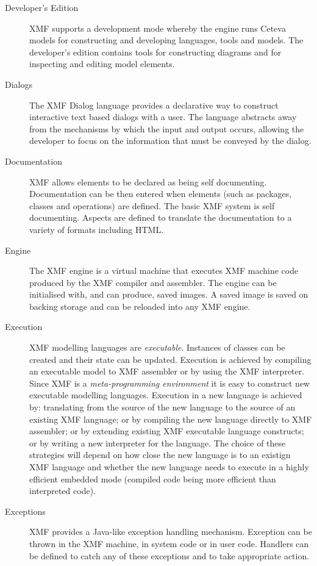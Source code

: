 \documentclass{article}
\begin{document}
\begin{description}
\item[Developer's Edition]
XMF supports a development mode whereby the engine runs Ceteva models
for constructing and developing languages, tools and models. The developer's
edition contains tools for constructing diagrams and for inspecting and
editing model elements. 

\item[Dialogs]
The XMF Dialog language provides a declarative way to construct interactive
text based dialogs with a user. The language abstracts away from the mechanisms
by which the input and output occurs, allowing the developer to focus on the
information that must be conveyed by the dialog.

\item[Documentation]
XMF allows elements to be declared as being self documenting. Documentation
can be then entered when elements (such as packages, classes and operations)
are defined. The basic XMF system is self documenting. Aspects are defined
to translate the documentation to a variety of formats including HTML.

\item[Engine]
The XMF engine is a virtual machine that executes XMF machine code produced 
by the XMF compiler and assembler. The engine can be initialised with, and
can produce, saved images. A saved image is saved on backing storage and can
be reloaded into any XMF engine.

\item[Execution]
XMF modelling languages are {\em executable}. Instances of classes can
be created and their state can be updated. Execution is achieved by compiling
an executable model to XMF assembler or by using the XMF interpreter. Since
XMF is a {\em meta-programming environment} it is easy to construct new executable
modelling languages. Execution in a new language is achieved by: translating
from the source of the new language to the source of an existing XMF language;
or by compiling the new language directly to XMF assembler; or by extending
existing XMF executable language constructs; or by writing a new interpreter
for the language. The choice of these strategies will depend on how close the new
language is to an existign XMF language and whether the new language needs to
execute in a highly efficient embedded mode (compiled code being more efficient
than interpreted code).

\item[Exceptions]
XMF provides a Java-like exception handling mechanism. Exception can be thrown
in the XMF machine, in system code or in user code. Handlers can be defined
to catch any of these exceptions and to take appropriate action.


\end{description}
\end{document}
